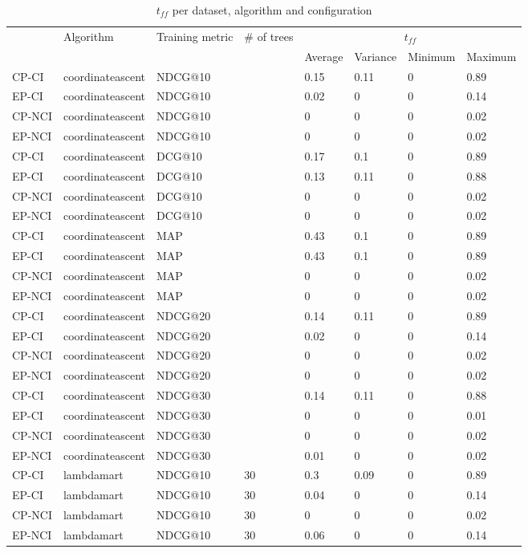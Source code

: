 \begin{landscape}
\begin{longtable}{|*{8}{l|}}
\caption{$t_{ff}$ per dataset, algorithm and configuration}
\hline\endhead
\hline\endfoot
\multirow{2}{*}{Dataset}&
\multirow{2}{*}{Algorithm}&
\multirow{2}{*}{Training metric}&
\multirow{2}{*}{\# of trees}&
\multicolumn{4}{c|}{$t_{ff}$}\\
&&&& Average & Variance & Minimum & Maximum \\\hline
CP-CI&coordinateascent&NDCG@10&&0.15&0.11&0&0.89\\
EP-CI&coordinateascent&NDCG@10&&0.02&0&0&0.14\\
CP-NCI&coordinateascent&NDCG@10&&0&0&0&0.02\\
EP-NCI&coordinateascent&NDCG@10&&0&0&0&0.02\\
\hline
CP-CI&coordinateascent&DCG@10&&0.17&0.1&0&0.89\\
EP-CI&coordinateascent&DCG@10&&0.13&0.11&0&0.88\\
CP-NCI&coordinateascent&DCG@10&&0&0&0&0.02\\
EP-NCI&coordinateascent&DCG@10&&0&0&0&0.02\\
\hline
CP-CI&coordinateascent&MAP&&0.43&0.1&0&0.89\\
EP-CI&coordinateascent&MAP&&0.43&0.1&0&0.89\\
CP-NCI&coordinateascent&MAP&&0&0&0&0.02\\
EP-NCI&coordinateascent&MAP&&0&0&0&0.02\\
\hline
CP-CI&coordinateascent&NDCG@20&&0.14&0.11&0&0.89\\
EP-CI&coordinateascent&NDCG@20&&0.02&0&0&0.14\\
CP-NCI&coordinateascent&NDCG@20&&0&0&0&0.02\\
EP-NCI&coordinateascent&NDCG@20&&0&0&0&0.02\\
\hline
CP-CI&coordinateascent&NDCG@30&&0.14&0.11&0&0.88\\
EP-CI&coordinateascent&NDCG@30&&0&0&0&0.01\\
CP-NCI&coordinateascent&NDCG@30&&0&0&0&0.02\\
EP-NCI&coordinateascent&NDCG@30&&0.01&0&0&0.02\\
\hline
CP-CI&lambdamart&NDCG@10&30&0.3&0.09&0&0.89\\
EP-CI&lambdamart&NDCG@10&30&0.04&0&0&0.14\\
CP-NCI&lambdamart&NDCG@10&30&0&0&0&0.02\\
EP-NCI&lambdamart&NDCG@10&30&0.06&0&0&0.14\\

\end{longtable}
\end{landscape}
